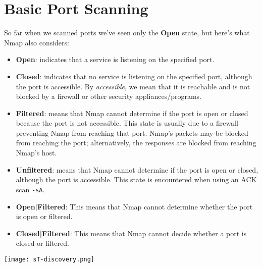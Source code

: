 \documentclass[11pt]{article}
\begin{document}
\setcounter{section}{3}
\setcounter{page}{13}  %

\renewcommand{\thesubsubsection}{\thesubsection.\Roman{subsubsection}}

\section{Basic Port Scanning}

\begin{tcolorbox}[colback=codebackground, colframe=warningcolor]
  So far when we scanned ports we've seen only the \textbf{Open}
  state, but here's what Nmap also considers:

  \begin{itemize}[leftmargin=*]
    \item \textbf{Open}: indicates that a service is listening on the
      specified port.
    \item \textbf{Closed}: indicates that no service is listening on
      the specified port, although the port is accessible. By
      \textit{accessible}, we mean that it is reachable and is not
      blocked by a firewall or other security appliances/programs.
    \item \textbf{Filtered}: means that Nmap cannot determine if the
      port is open or closed because the port is not accessible. This
      state is usually due to a firewall preventing Nmap from
      reaching that port. Nmap's packets may be blocked from reaching
      the port; alternatively, the responses are blocked from
      reaching Nmap's host.
    \item \textbf{Unfiltered}: means that Nmap cannot determine if
      the port is open or closed, although the port is accessible.
      This state is encountered when using an ACK scan \texttt{-sA}.
    \item \textbf{Open|Filtered}: This means that Nmap cannot
      determine whether the port is open or filtered.
    \item \textbf{Closed|Filtered}: This means that Nmap cannot
      decide whether a port is closed or filtered.
  \end{itemize}
\end{tcolorbox}

\begin{center}
  \texttt{[image: sT-discovery.png]}
  \label{fig:sT-scan}
\end{center}
\end{document}
